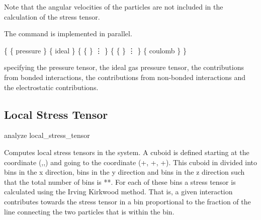 Note that the
angular velocities of the particles are not included in the calculation of the stress tensor. 


The command is implemented in parallel.


\begin{code}
\{ \{ pressure  \}
   \{ ideal  \} 
   \{ \{   \}
      \vdots
   \}
   \{ \{   \}
      \vdots
   \}
   \{ coulomb  \}
\}
\end{code}
specifying the pressure tensor, the ideal gas pressure tensor, the
contributions from bonded interactions, the contributions from
non-bonded interactions and the electrostatic contributions.

\subsection{Local Stress Tensor}
\label{analyze:localstresstensor}
\begin{pysyntax}
\end{pysyntax}

\begin{essyntax}
  analyze local_stress_tensor             
\end{essyntax}

Computes local stress tensors in the system.  A cuboid is defined starting at the coordinate
(,,) and going to the coordinate
(+, +,
+).  This cuboid in divided into  bins in the x
direction,  bins in the y direction and  bins in the z direction such that
the total number of bins is **.  For each of these bins a stress
tensor is calculated using the Irving Kirkwood method.  That is, a given interaction contributes
towards the stress tensor in a bin proportional to the fraction of the line connecting the two
particles that is within the bin.

